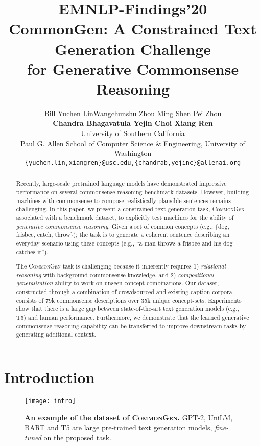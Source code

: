 \documentclass[11pt,a4paper]{article}
\title{\vspace*{-0.5in}
{{\small \hfill EMNLP-Findings'20}\\
\vspace*{.25in}}  {C}ommon{G}en: {A} {C}onstrained {T}ext {G}eneration {C}hallenge \\ for {G}enerative {C}ommonsense {R}easoning}
\author{ 
Bill Yuchen Lin\textsuperscript{{}}\quad  Wangchunshu Zhou\textsuperscript{{}}\quad
Ming Shen\textsuperscript{{}} \quad 
Pei Zhou\textsuperscript{{}} \quad 
\\ \textbf{Chandra Bhagavatula\textsuperscript{{}} \quad Yejin Choi\textsuperscript{{}}
\quad Xiang Ren\textsuperscript{{}}
}
\\
{{\textsuperscript{}University of Southern California}} \quad {\textsuperscript{}Allen Institute for Artificial Intelligence} \\ 
{\textsuperscript{}Paul G. Allen School of Computer Science \& Engineering, University of Washington}\\
{
\texttt{\{yuchen.lin,xiangren\}@usc.edu,\{chandrab,yejinc\}@allenai.org}} 
}
\begin{document}
 
\maketitle



\begin{abstract}




Recently, large-scale pretrained language models have demonstrated impressive performance on several commonsense-reasoning benchmark datasets. However, building machines with commonsense to compose realistically plausible sentences remains challenging.
In this paper, we present a constrained text generation task, \textsc{CommonGen} associated with a benchmark dataset, to explicitly test machines for the ability of \textit{generative commonsense reasoning}.
Given a set of common concepts (e.g., \{dog, frisbee, catch, throw\}); the task is to generate a coherent sentence describing an everyday scenario using these concepts (e.g., ``a man throws a frisbee and his dog catches it'').

The \textsc{CommonGen} task is challenging because it inherently requires 1) \textit{relational reasoning} with background  commonsense knowledge, and 2) \textit{compositional generalization} ability to work on unseen concept combinations.
Our dataset, constructed through a combination of crowdsourced and existing caption corpora, consists of 
79k commonsense descriptions over 35k unique concept-sets.
Experiments show that there is  a large gap between state-of-the-art text generation models (e.g., T5) and human performance.
Furthermore, we demonstrate that the learned generative commonsense reasoning capability can be transferred to improve downstream tasks 
by generating additional context.
\end{abstract}

  \section{Introduction}
\label{sec:intro}

\begin{figure}[ht!]
	\centering
	\texttt{[image: intro]}
	\caption{\small{\textbf{An example of the dataset of \textsc{CommonGen}.} GPT-2, UniLM, BART and T5 are large pre-trained text generation models, \textit{fine-tuned} on the proposed task.}
	\vspace{-1em}
	}
	\label{fig:intro}
\end{figure}
\end{document}
